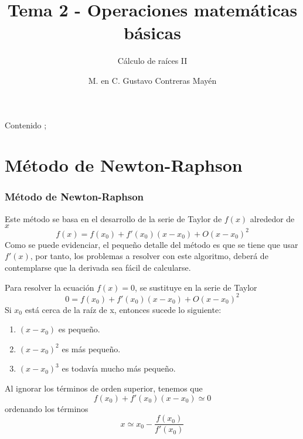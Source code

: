 


\title{Tema 2 - Operaciones matem\'{a}ticas b\'{a}sicas}
\subtitle{C\'{a}lculo de ra\'{i}ces II}
\author{M. en C. Gustavo Contreras May\'{e}n}
\maketitle
\fontsize{14}{14}\selectfont
{}
\begin{frame}{Contenido}
;\tableofcontents[pausesections]
\end{frame}
\section{M\'{e}todo de Newton-Raphson}
\begin{frame}
\frametitle{M\'{e}todo de Newton-Raphson}
Este m\'{e}todo se basa en el desarrollo de la serie de Taylor de $f(x)$ alrededor de $x$
\[ f(x) = f(x_{0}) + f'(x_{0}) (x-x_{0}) + O(x-x_{0})^{2} \]
Como se puede evidenciar, el pequeño detalle del m\'{e}todo es que se tiene que usar $f'(x)$, por tanto, los problemas a resolver con este algoritmo, deber\'{a} de contemplarse que la derivada sea f\'{a}cil de calcularse.
\end{frame}
\begin{frame}
Para resolver la ecuaci\'{o}n $f(x)=0$, se sustituye en la serie de Taylor
\[ 0 = f(x_{0}) + f'(x_{0}) (x-x_{0}) + O(x-x_{0})^{2} \]
Si $x_{0}$ est\'{a} cerca de la ra\'{i}z de x, entonces sucede lo siguiente:
\begin{enumerate}[<+->]
\item $(x-x_{0})$ es pequeño.
\item $(x-x_{0})^{2}$ es m\'{a}s pequeño.
\item $(x-x_{0})^{3}$ es todav\'{i}a mucho m\'{a}s pequeño.
\end{enumerate}
\end{frame}
\begin{frame}
Al ignorar los t\'{e}rminos de orden superior, tenemos que
\[ f(x_{0}) + f'(x_{0})(x-x_{0}) \simeq 0\]
ordenando los t\'{e}rminos
\[ x \simeq x_{0} - \dfrac{f(x_{0})}{f'(x_{0})} \]
\end{frame}
